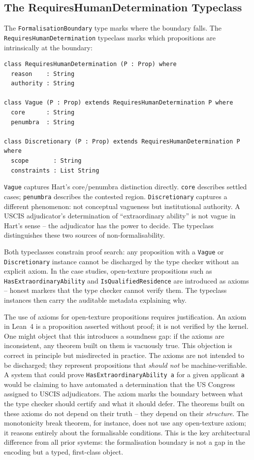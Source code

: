 \documentclass[runningheads]{llncs}
\begin{document}
\subsection{The RequiresHumanDetermination Typeclass}

The \texttt{FormalisationBoundary} type marks where the boundary falls. The
\texttt{RequiresHumanDetermination} typeclass marks which propositions are
intrinsically at the boundary:

\begin{lstlisting}[language=lean4]
class RequiresHumanDetermination (P : Prop) where
  reason    : String
  authority : String

class Vague (P : Prop) extends RequiresHumanDetermination P where
  core      : String
  penumbra  : String

class Discretionary (P : Prop) extends RequiresHumanDetermination P where
  scope       : String
  constraints : List String
\end{lstlisting}

\texttt{Vague} captures Hart's core/penumbra distinction directly. \texttt{core}
describes settled cases; \texttt{penumbra} describes the contested region.
\texttt{Discretionary} captures a different phenomenon: not conceptual vagueness
but institutional authority. A USCIS adjudicator's determination of
``extraordinary ability'' is not vague in Hart's sense -- the adjudicator has
the power to decide. The typeclass distinguishes these two sources of
non-formalisability.

Both typeclasses constrain proof search: any proposition with a \texttt{Vague}
or \texttt{Discretionary} instance cannot be discharged by the type checker
without an explicit axiom. In the case studies, open-texture propositions such
as \texttt{HasExtraordinaryAbility} and \texttt{IsQualifiedResidence} are
introduced as axioms -- honest markers that the type checker cannot verify them.
The typeclass instances then carry the auditable metadata explaining why.

The use of axioms for open-texture propositions requires justification. An axiom
in Lean~4 is a proposition asserted without proof; it is not verified by the
kernel. One might object that this introduces a soundness gap: if the axioms are
inconsistent, any theorem built on them is vacuously true. This objection is
correct in principle but misdirected in practice. The axioms are not intended to
be discharged; they represent propositions that \textit{should not} be
machine-verifiable. A system that could prove \texttt{HasExtraordinaryAbility~a}
for a given applicant \texttt{a} would be claiming to have automated a
determination that the US Congress assigned to USCIS adjudicators. The axiom
marks the boundary between what the type checker should certify and what it
should defer. The theorems built on these axioms do not depend on their truth --
they depend on their \textit{structure}. The monotonicity break theorem, for
instance, does not use any open-texture axiom; it reasons entirely about the
formalisable conditions. This is the key architectural difference from all prior
systems: the formalisation boundary is not a gap in the encoding but a typed,
first-class object.
\end{document}
